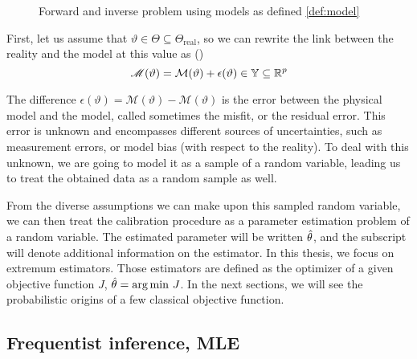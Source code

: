 \documentclass[../../Main_ManuscritThese.tex]{subfiles}
\newcommand\imgpath{/home/victor/acadwriting/Manuscrit/Text/Chapter2/img/}
\begin{document}
\begin{figure}[ht]
  \centering
  
  \caption{Forward and inverse problem using models as defined \cref{def:model}}
  \label{fig:inv_problem}
\end{figure}

% 

First, let us assume that $\vartheta \in \Theta \subseteq \Theta_{\mathrm{real}}$, so we can rewrite the link between the reality and the model at this value as (\cite{kennedy_bayesian_2001,higdon_combining_2004})
\begin{equation}
  \label{eq:vartheta_models}
    \mathscr{M}(\vartheta) = %
    \mathcal{M}(\vartheta) + \epsilon(\vartheta) \in \Yspace \subseteq \mathbb{R}^p
  \end{equation}
 
  The difference $\epsilon(\vartheta) = \mathscr{M}(\vartheta) - \mathcal{M}(\vartheta)$ is the error between the physical model and the model, called sometimes the misfit, or the residual error.
  This error is unknown and encompasses different sources of uncertainties, such as measurement errors, or model bias (with respect to the reality). To deal with this unknown, we are going to model it as a sample of a random variable, leading us to treat the obtained data as a random sample as well.

  From the diverse assumptions we can make upon this sampled random variable, we can then treat the calibration procedure as a parameter estimation problem of a random variable.
  The estimated parameter will be written $\hat{\theta}$, and the subscript will denote additional information on the estimator. 
  In this thesis, we focus on extremum estimators. Those estimators are defined as the optimizer of a given objective function $J$, $\hat{\theta} = \operatorname*{arg\,min \,} J$. In the next sections, we will see the probabilistic origins of a few classical objective function.
\subsection{Frequentist inference, MLE}
\label{sec:frequentist_inference_MLE}
\end{document}
